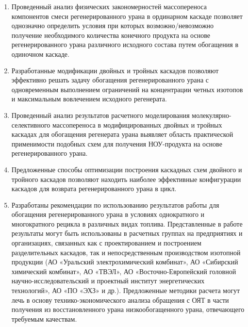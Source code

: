 {\influence} 
\begin{enumerate}
  \item Проведенный анализ физических закономерностей массопереноса компонентов смеси регенерированного урана в ординарном каскаде позволяет однозначно определить условия при которых возможно/невозможно получение необходимого количества конечного продукта на основе регенерированного урана различного исходного состава путем обогащения в одиночном каскаде.
  \item Разработанные модификации двойных и тройных каскадов позволяют эффективно решать задачу обогащения регенерированного урана с одновременным выполнением ограничений на концентрации четных изотопов и максимальным вовлечением исходного регенерата.
  \item Проведенный анализ результатов расчетного моделирования молекулярно-селективного массопереноса в модифицированных двойных и тройных каскадах для обогащения регенерата урана выявляет область практической применимости подобных схем для получения НОУ-продукта на основе регенерированного урана.
  \item Предложенные способы оптимизации построения каскадных схем двойного и тройного каскадов позволяют находить наиболее эффективные конфигурации каскадов для возврата регенерированного урана в цикл.
  \item Разработаны рекомендации по использованию результатов работы для обогащения регенерированного урана в условиях однократного и многократного рецикла в различных видах топлива. Представленные в работе результаты могут быть использованы в расчетных группах на предприятиях и организациях, связанных как с проектированием и построением разделительных каскадов, так и непосредственным производством изотопной продукции (АО «Уральский электрохимический комбинат», АО «Сибирский химический комбинат», АО «ТВЭЛ», АО «Восточно-Европейский головной научно-исследовательский и проектный институт энергетических технологий», АО «ПО «ЭХЗ» и др.). Предложенные методики расчета могут лечь в основу технико-экономического анализа обращения с ОЯТ в части получения из восстановленного урана низкообогащенного урана, отвечающего требуемым качествам.  
\end{enumerate}


